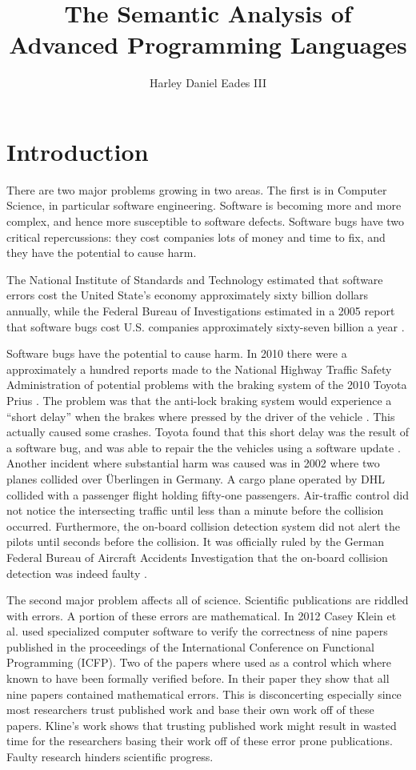 \documentclass[phd,appendix,dedicationpage,ackpage,epigraphpage]{uithesis}
\title{The Semantic Analysis of Advanced Programming Languages}
\author{Harley Daniel Eades III}
\begin{document}
\frontmatter

\section{Introduction}
\label{sec:introduction}

There are two major problems growing in two areas.  The first is in
Computer Science, in particular software engineering. Software is
becoming more and more complex, and hence more susceptible to software
defects.  Software bugs have two critical repercussions: they cost
companies lots of money and time to fix, and they have the potential
to cause harm. 

The National Institute of Standards and Technology estimated that
software errors cost the United State's economy approximately sixty
billion dollars annually, while the Federal Bureau of Investigations
estimated in a 2005 report that software bugs cost U.S. companies
approximately sixty-seven billion a year \cite{nist02,fbi05}.

Software bugs have the potential to cause harm.  In 2010 there were a
approximately a hundred reports made to the National Highway Traffic
Safety Administration of potential problems with the braking system of
the 2010 Toyota Prius \cite{Consumer:2010}.  The problem was that the
anti-lock braking system would experience a ``short delay'' when
the brakes where pressed by the driver of the vehicle
\cite{thedetroitbureau.com:2009}.  This actually caused some crashes.
Toyota found that this short delay was the result of a software bug,
and was able to repair the the vehicles using a software update
\cite{Reuters:2009}.  Another incident where substantial harm was
caused was in 2002 where two planes collided over \"{U}berlingen in
Germany. A cargo plane operated by DHL collided with a passenger
flight holding fifty-one passengers.  Air-traffic control did not
notice the intersecting traffic until less than a minute before the
collision occurred.  Furthermore, the on-board collision detection
system did not alert the pilots until seconds before the collision.
It was officially ruled by the German Federal Bureau of Aircraft
Accidents Investigation that the on-board collision detection was
indeed faulty \cite{Collision:2004}.

The second major problem affects all of science.  Scientific
publications are riddled with errors.  A portion of these errors are
mathematical.  In 2012 Casey Klein et al. used specialized computer
software to verify the correctness of nine papers published in the
proceedings of the International Conference on Functional Programming
(ICFP).  Two of the papers where used as a control which where known
to have been formally verified before.  In their paper
\cite{Klein:2012} they show that all nine papers contained
mathematical errors.  This is disconcerting especially since most
researchers trust published work and base their own work off of these
papers.  Kline's work shows that trusting published work might result
in wasted time for the researchers basing their work off of these
error prone publications.  Faulty research hinders scientific
progress.
\end{document}
